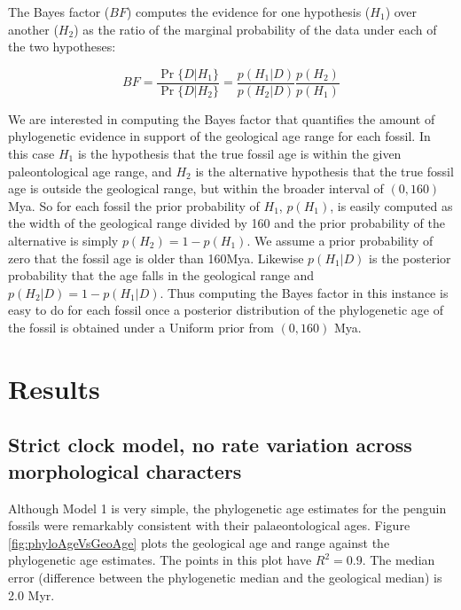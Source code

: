 \documentclass[11pt]{article}
\begin{document}
The Bayes factor ($BF$) computes the evidence for one hypothesis ($H_1$) over another ($H_2$) as the ratio of the marginal probability of the data under each of the two hypotheses:

\begin{equation}
BF = \frac{\Pr\{D|H_1\}}{\Pr\{D|H_2\}} = \frac{p(H_1|D)}{p(H_2|D)}\frac{p(H_2)}{p(H_1)}
\end{equation}

We are interested in computing the Bayes factor that quantifies the amount of phylogenetic evidence in support of the geological age range for each fossil. In this case $H_1$ is the hypothesis that the true fossil age is within the given paleontological age range, and $H_2$ is the alternative hypothesis that the true fossil age is outside the geological range, but within the broader interval of $(0,160)$ Mya. So for each fossil the prior probability of $H_1$, $p(H_1)$, is easily computed as the width of the geological range divided by 160 and the prior probability of the alternative is simply $p(H_2) = 1 - p(H_1)$. We assume a prior probability of zero that the fossil age is older than 160Mya. Likewise $p(H_1 | D)$ is the posterior probability that the age falls in the geological range and $p(H_2 | D) = 1 - p(H_1 | D)$. Thus computing the Bayes factor in this instance is easy to do for each fossil once a posterior distribution of the phylogenetic age of the fossil is obtained under a Uniform prior from $(0,160)$ Mya.

\section*{Results}


\subsection*{Strict clock model, no rate variation across morphological characters}
Although Model 1 is very simple, the phylogenetic age estimates for the penguin fossils were remarkably consistent with their palaeontological ages. Figure \ref{fig:phyloAgeVsGeoAge} plots the geological age and range against the phylogenetic age estimates. The points in this plot have $R^2 = 0.9$. The median error (difference between the phylogenetic median and the geological median) is 2.0 Myr.
\end{document}
